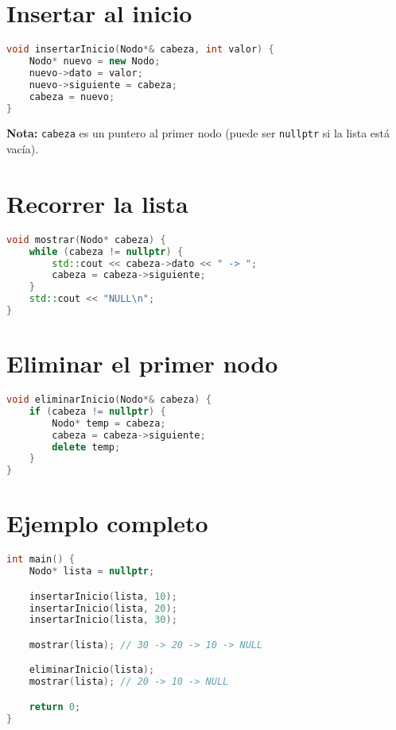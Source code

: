 \documentclass[a4paper]{article}
\begin{document}
\section{Insertar al inicio}

\begin{lstlisting}[language=C++]
void insertarInicio(Nodo*& cabeza, int valor) {
    Nodo* nuevo = new Nodo;
    nuevo->dato = valor;
    nuevo->siguiente = cabeza;
    cabeza = nuevo;
}
\end{lstlisting}

\textbf{Nota:} \texttt{cabeza} es un puntero al primer nodo (puede ser \texttt{nullptr} si la lista está vacía).

\section{Recorrer la lista}

\begin{lstlisting}[language=C++]
void mostrar(Nodo* cabeza) {
    while (cabeza != nullptr) {
        std::cout << cabeza->dato << " -> ";
        cabeza = cabeza->siguiente;
    }
    std::cout << "NULL\n";
}
\end{lstlisting}

\section{Eliminar el primer nodo}

\begin{lstlisting}[language=C++]
void eliminarInicio(Nodo*& cabeza) {
    if (cabeza != nullptr) {
        Nodo* temp = cabeza;
        cabeza = cabeza->siguiente;
        delete temp;
    }
}
\end{lstlisting}

\section{Ejemplo completo}

\begin{lstlisting}[language=C++]
int main() {
    Nodo* lista = nullptr;

    insertarInicio(lista, 10);
    insertarInicio(lista, 20);
    insertarInicio(lista, 30);

    mostrar(lista); // 30 -> 20 -> 10 -> NULL

    eliminarInicio(lista);
    mostrar(lista); // 20 -> 10 -> NULL

    return 0;
}
\end{lstlisting}
\end{document}
